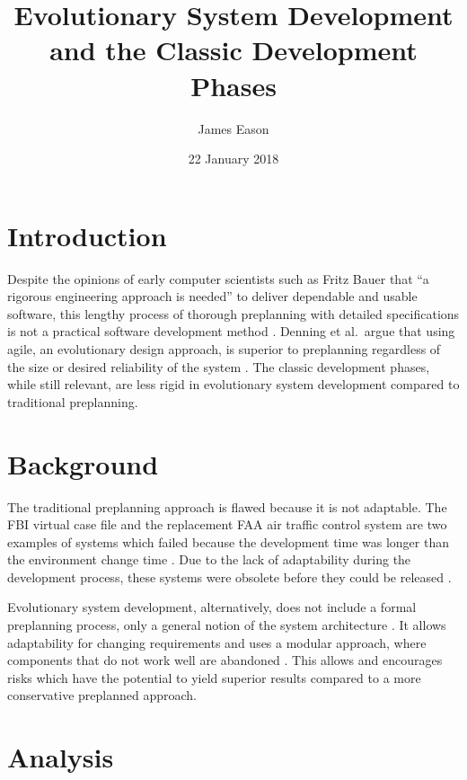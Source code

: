 \documentclass[11pt]{article}
\title{Evolutionary System Development and the Classic Development Phases}
\author{James Eason}
\date{22 January 2018}
\begin{document}
\maketitle

\thispagestyle{empty}

\begin{doublespace}
  \section{Introduction}

Despite the opinions of early computer scientists such as Fritz Bauer that 
``a rigorous engineering approach is needed'' to deliver dependable and usable software, 
this lengthy process of thorough preplanning with detailed specifications
is not a practical software development method \cite{denning2008}. Denning et al.\ argue that 
using agile, an evolutionary design approach, is superior to preplanning regardless
of the size or desired reliability of the system \cite{denning2008}. The classic development phases, 
while still relevant, are less rigid in evolutionary system development compared to traditional preplanning.

  \section{Background}

The traditional preplanning approach is flawed because it is not adaptable. 
The FBI virtual case file and the replacement FAA air traffic control system are 
two examples of systems which failed because the development time was longer
than the environment change time \cite{denning2008}. Due to the lack of adaptability during the development
process, these systems were obsolete before they could be released \cite{denning2008}.

Evolutionary system development, alternatively, does not include a formal preplanning process,
only a general notion of the system architecture \cite{denning2008}. It allows adaptability for changing requirements and uses a modular approach, where components that do not work well are abandoned \cite{denning2008}. This allows and encourages 
risks which have the potential to yield superior results compared to a more conservative preplanned approach.

  \section{Analysis}
  

\end{doublespace}
\end{document}
